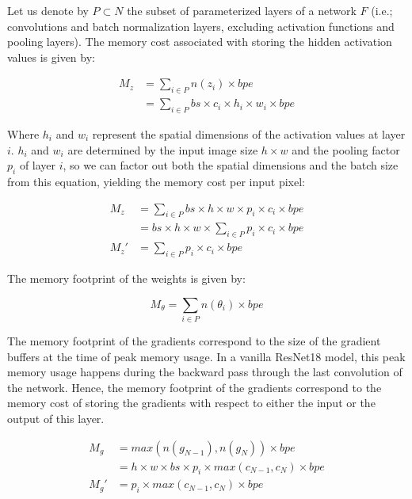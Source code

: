 \documentclass[twocolumn]{bmcart}
\begin{document}
Let us denote by $P \subset N$ the subset of parameterized layers of a network $F$
(i.e.; convolutions and batch normalization layers, excluding activation functions and pooling layers).
The memory cost associated with storing the hidden activation values is given by:

\begin{subequations}
\begin{align}
M_{z} &= \sum_{i \in P} n(z_i) \times bpe \\
      &= \sum_{i \in P} bs \times c_i \times h_i \times w_i \times bpe
\end{align}
\end{subequations}

Where $h_i$ and $w_i$ represent the spatial dimensions of the activation values at layer $i$.
$h_i$ and $w_i$ are determined by the input image size $h \times w$ and the pooling factor $p_i$ of layer $i$,
so we can factor out both the spatial dimensions and the batch size from this equation,
yielding the memory cost per input pixel:

\begin{subequations}
\begin{align}
M_{z}  &= \sum_{i \in P} bs \times h \times w \times p_i \times c_i \times bpe \\
       &= bs \times h \times w \times \sum_{i \in P} p_i \times c_i \times bpe \\
M_{z}' &= \sum_{i \in P} p_i \times c_i \times bpe
\end{align}
\end{subequations}

The memory footprint of the weights is given by:

\begin{equation}
 M_{\theta} = \sum_{i \in P}  n(\theta_i)\times bpe
\end{equation}

The memory footprint of the gradients correspond to the size of the gradient buffers at the time of peak memory usage.
In a vanilla ResNet18 model, this peak memory usage happens during the backward pass through the last convolution of the network.
Hence, the memory footprint of the gradients correspond to the memory cost of storing the gradients with respect to either the input or the output of this layer.

\begin{subequations}
\begin{align}
M_{g}  &= max(n(g_{N-1}), n(g_N)) \times bpe \\
       &= h \times w \times bs \times p_i \times max(c_{N-1}, c_N) \times bpe\\
M_{g}' &= p_i \times max(c_{N-1}, c_N) \times bpe
\end{align}
\end{subequations}
\end{document}
